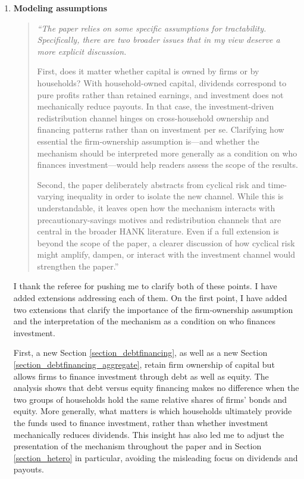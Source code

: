 \documentclass[11pt]{article}
\begin{document}
\begin{enumerate} [  1.]
\item  \textbf{Modeling assumptions}

\begin{quote}
\itshape ``The paper relies on some specific assumptions for tractability. Specifically, there are two broader issues that in my view deserve a more explicit discussion.

First, does it matter whether capital is owned by firms or by households? With household-owned capital, dividends correspond to pure profits rather than retained earnings, and investment does not mechanically reduce payouts. In that case, the investment-driven redistribution channel hinges on cross-household ownership and financing patterns rather than on investment per se. Clarifying how essential the firm-ownership assumption is---and whether the mechanism should be interpreted more generally as a condition on who finances investment---would help readers assess the scope of the results.

Second, the paper deliberately abstracts from cyclical risk and time-varying inequality in order to isolate the new channel. While this is understandable, it leaves open how the mechanism interacts with precautionary-savings motives and redistribution channels that are central in the broader HANK literature. Even if a full extension is beyond the scope of the paper, a clearer discussion of how cyclical risk might amplify, dampen, or interact with the investment channel would strengthen the paper.''
\end{quote}

I thank the referee for pushing me to clarify both of these points. I have added extensions addressing each of them. On the first point, I have added two extensions that clarify the importance of the firm-ownership assumption and the interpretation of the mechanism as a condition on who finances investment.

First, a new Section \ref{section_debtfinancing}, as well as a new Section \ref{section_debtfinancing_aggregate}, retain firm ownership of capital but allows firms to finance investment through debt as well as equity. The analysis shows that debt versus equity financing makes no difference when the two groups of households hold the same relative shares of firms' bonds and equity. More generally, what matters is which households ultimately provide the funds used to finance investment, rather than whether investment mechanically reduces dividends. This insight has also led me to adjust the presentation of the mechanism throughout the paper and in Section \ref{section_hetero} in particular, avoiding the misleading focus on dividends and payouts.


\end{enumerate}
\end{document}

